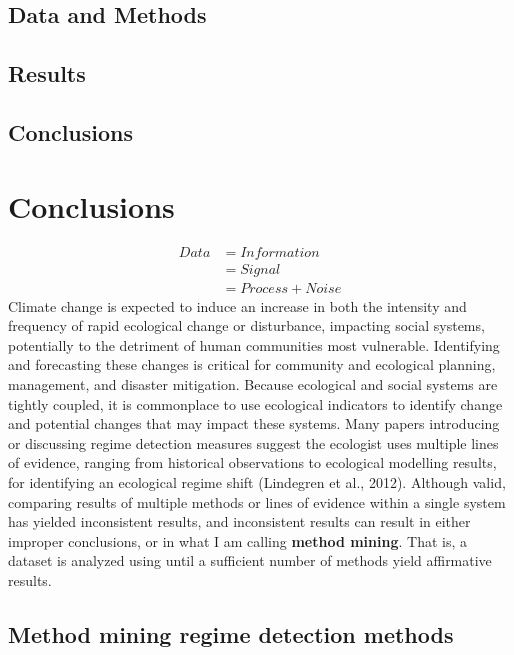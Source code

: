 \documentclass[12pt,twoside,openany]{reedthesis}
\begin{document}
\section{Data and Methods}\label{data-and-methods-2}

\section{Results}\label{results-3}

\section{Conclusions}\label{conclusions-1}

\chapter{Conclusions}\label{conclusions-2}
\begin{equation}
\begin{split}
Data  & = Information \\
& = Signal \\
& = Process + Noise
\end{split}
\label{eq:infoTheory}
\end{equation}
Climate change is expected to induce an increase in both the intensity
and frequency of rapid ecological change or disturbance, impacting
social systems, potentially to the detriment of human communities most
vulnerable. Identifying and forecasting these changes is critical for
community and ecological planning, management, and disaster mitigation.
Because ecological and social systems are tightly coupled, it is
commonplace to use ecological indicators to identify change and
potential changes that may impact these systems. Many papers introducing
or discussing regime detection measures suggest the ecologist uses
multiple lines of evidence, ranging from historical observations to
ecological modelling results, for identifying an ecological regime shift
(Lindegren et al., 2012). Although valid, comparing results of multiple
methods or lines of evidence within a single system has yielded
inconsistent results, and inconsistent results can result in either
improper conclusions, or in what I am calling \textbf{method mining}.
That is, a dataset is analyzed using until a sufficient number of
methods yield affirmative results.

\section{Method mining regime detection
methods}\label{method-mining-regime-detection-methods}
\end{document}
